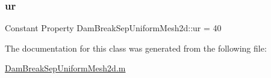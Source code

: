 \subsubsection{\texorpdfstring{ur}{ur}}
{\footnotesize\ttfamily Constant Property Dam\+Break\+Sep\+Uniform\+Mesh2d\+::ur = 40}



The documentation for this class was generated from the following file\+:\begin{DoxyCompactItemize}
\item 
\hyperlink{_dam_break_sep_uniform_mesh2d_8m}{Dam\+Break\+Sep\+Uniform\+Mesh2d.\+m}\end{DoxyCompactItemize}
